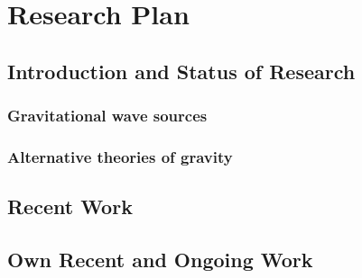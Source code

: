 \documentclass[11pt]{article}
\begin{document}
\renewcommand{\thesection}{\Alph{section}}
\renewcommand{\thesubsection}{\arabic{subsection}}

\newpage

\section*{Research Plan}

\begin{abstract}
\end{abstract}


\subsection{Introduction and Status of Research}

\subsubsection{}

\subsubsection{Gravitational wave sources}

\subsubsection{}

\subsubsection{Alternative theories of gravity}


\newpage
\subsection{Recent Work}
\label{}

\subsubsection{}


\newpage
\subsection{Own Recent and Ongoing Work}
\label{}

\subsubsection{}
\end{document}
